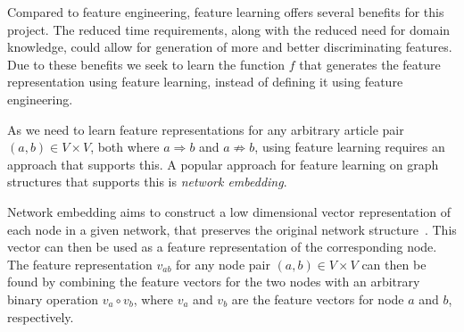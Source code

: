 Compared to feature engineering, feature learning offers several benefits for this project. The reduced time requirements, along with the reduced need for domain knowledge, could allow for generation of more and better discriminating features. Due to these benefits we seek to learn the function $f$ that generates the feature representation using feature learning, instead of defining it using feature engineering.

As we need to learn feature representations for any arbitrary article pair $(a,b) \in V \times V$, both where $a \Rightarrow b$ and $a \not \Rightarrow b$, using feature learning requires an approach that supports this. A popular approach for feature learning on graph structures that supports this is \emph{network embedding}.

Network embedding aims to construct a low dimensional vector representation of each node in a given network, that preserves the original network structure~\cite{sun2016general}. This vector can then be used as a feature representation of the corresponding node. The feature representation $v_{ab}$ for any node pair $(a,b) \in V \times V$ can then be found by combining the feature vectors for the two nodes with an arbitrary binary operation $v_{a} \circ v_{b}$, where $v_{a}$ and ${v_b}$ are the feature vectors for node $a$ and $b$, respectively.




